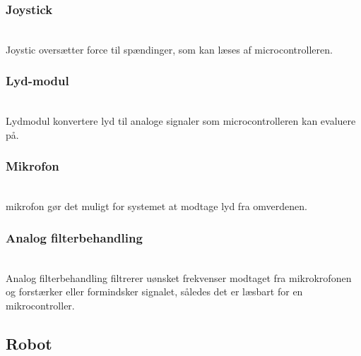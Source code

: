 \subsubsection*{\textbf{Joystick}}\hfill\\
Joystic oversætter force til spændinger, som kan læses af microcontrolleren.
\subsubsection*{\textbf{Lyd-modul}}\hfill\\
Lydmodul konvertere lyd til analoge signaler som microcontrolleren kan evaluere på.
\subsubsection*{\textbf{Mikrofon}}\hfill\\
mikrofon gør det muligt for systemet at modtage lyd fra omverdenen.
\subsubsection*{\textbf{Analog filterbehandling}}\hfill\\
Analog filterbehandling filtrerer uønsket frekvenser modtaget fra mikrokrofonen og forstærker eller formindsker signalet, således det er læsbart for en mikrocontroller.


\subsection{Robot}